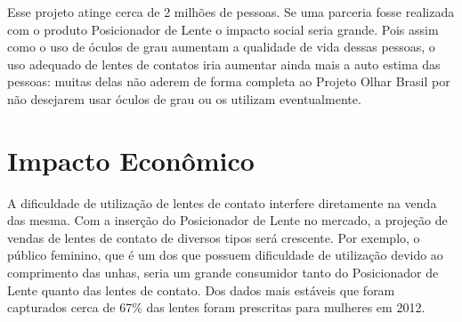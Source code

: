 Esse projeto atinge cerca de 2 milhões de pessoas. Se uma parceria fosse realizada com o produto Posicionador de Lente o impacto social seria grande. Pois assim como o uso de óculos de grau aumentam a qualidade de vida dessas pessoas, o uso adequado de lentes de contatos iria aumentar ainda mais a auto estima das pessoas: muitas delas não aderem de forma completa ao Projeto Olhar Brasil por não desejarem usar óculos de grau ou os utilizam eventualmente.


\section[Impacto Econômico]{Impacto Econômico}

A dificuldade de utilização de lentes de contato interfere diretamente na venda das mesma. Com a inserção do Posicionador de Lente no mercado, a projeção de vendas de lentes de contato de diversos tipos será crescente. Por exemplo, o público feminino, que é um dos que possuem dificuldade de utilização devido ao comprimento das unhas, seria um grande consumidor tanto do Posicionador de Lente quanto das lentes de contato. Dos dados mais estáveis que foram capturados cerca de 67\% das lentes foram prescritas para mulheres em 2012.